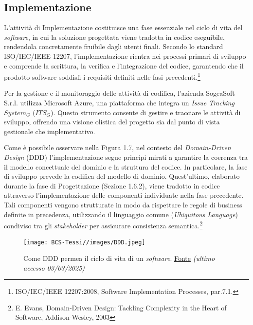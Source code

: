         \subsection{Implementazione}
        
        L'attività di Implementazione costituisce una fase essenziale nel ciclo di vita del \textit{software}, in cui la soluzione progettata viene tradotta in codice eseguibile, rendendola concretamente fruibile dagli utenti finali. Secondo lo standard ISO/IEC/IEEE 12207, l'implementazione rientra nei processi primari di sviluppo e comprende la scrittura, la verifica e l'integrazione del codice, garantendo che il prodotto software soddisfi i requisiti definiti nelle fasi precedenti.\footnote{ISO/IEC/IEEE 12207:2008, Software Implementation Processes, par.7.1.} 

        \noindent Per la gestione e il monitoraggio delle attività di codifica, l'azienda SogeaSoft S.r.l. utilizza Microsoft Azure, una piattaforma che integra un \textit{Issue Tracking $System_G$} ($ITS_G$). Questo strumento consente di gestire e tracciare le attività di sviluppo, offrendo una visione olistica del progetto sia dal punto di vista gestionale che implementativo.

        \noindent Come è possibile osservare nella Figura 1.7, nel contesto del \textit{Domain-Driven Design} (DDD) l’implementazione segue principi mirati a garantire la coerenza tra il modello concettuale del dominio e la struttura del codice. In particolare, la fase di sviluppo prevede la codifica del modello di dominio.
        Quest'ultimo, elaborato durante la fase di Progettazione (Sezione 1.6.2), viene tradotto in codice attraverso l'implementazione delle componenti individuate nella fase precedente. Tali componenti vengono strutturate in modo da rispettare le regole di business definite in precedenza, utilizzando il linguaggio comune (\textit{Ubiquitous Language}) condiviso tra gli \textit{stakeholder} per assicurare consistenza semantica.\footnote{E. Evans, Domain-Driven Design: Tackling Complexity in the Heart of Software, Addison-Wesley, 2003}

        \begin{figure}[H]
            \centering
            \texttt{[image: BCS-Tessi//images/DDD.jpeg]}
            \caption{Come DDD permea il ciclo di vita di un \textit{software}. \href{https://medium.com/raa-labs/part-1-domain-driven-design-like-a-pro-f9e78d081f10}{Fonte} \textit{(ultimo accesso 03/03/2025)}}
            \label{fig:DDD-generale}
        \end{figure}
        
